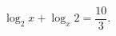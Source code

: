 \begin{ex}[type=equation]
	\begin{condition}
		$\log_2 x + \log_x 2 = \dfrac{10}{3}.$
	\end{condition}
\end{ex}
